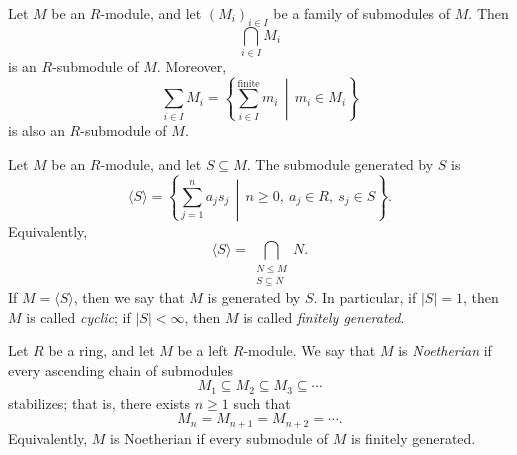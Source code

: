 \begin{definition}
    Let $M$ be an $R$-module, and let $(M_i)_{i \in I}$ be a family of submodules of $M$. Then
    \[
        \bigcap_{i \in I} M_i
    \]
    is an $R$-submodule of $M$. Moreover,
    \[
        \sum_{i \in I} M_i
        =
        \left\{ \sum_{i \in I}^{\mathrm{finite}} m_i \,\middle|\, m_i \in M_i \right\}
    \]
    is also an $R$-submodule of $M$.
\end{definition}

\begin{definition}
    Let $M$ be an $R$-module, and let $S \subseteq M$. The submodule generated by $S$ is
    \[
        \langle S \rangle
        =
        \left\{ \sum_{j=1}^n a_j s_j \,\middle|\, n \ge 0,\ a_j \in R,\ s_j \in S \right\}.
    \]
    Equivalently,
    \[
        \langle S \rangle
        =
        \bigcap_{\substack{N \le M \\ S \subseteq N}} N.
    \]
    If $M = \langle S \rangle$, then we say that $M$ is generated by $S$. In particular, if $|S| = 1$, then $M$ is called \emph{cyclic}; if $|S| < \infty$, then $M$ is called \emph{finitely generated}.
\end{definition}

\begin{definition}
    Let $R$ be a ring, and let $M$ be a left $R$-module. We say that $M$ is \emph{Noetherian} if every ascending chain of submodules
    \[
        M_1 \subseteq M_2 \subseteq M_3 \subseteq \cdots
    \]
    stabilizes; that is, there exists $n \ge 1$ such that
    \[
        M_n = M_{n+1} = M_{n+2} = \cdots.
    \]
    Equivalently, $M$ is Noetherian if every submodule of $M$ is finitely generated.
\end{definition}



